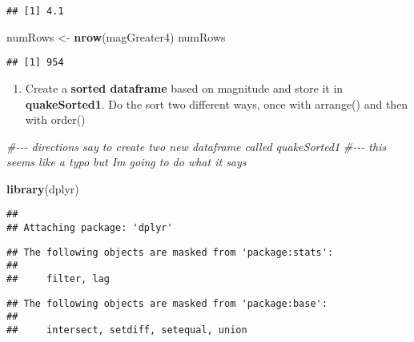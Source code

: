 \documentclass[
]{article}
\newenvironment{Shaded}{\begin{snugshade}}{\end{snugshade}}
\newcommand{\CommentTok}[1]{\textcolor[rgb]{0.56,0.35,0.01}{\textit{#1}}}
\newcommand{\FunctionTok}[1]{\textcolor[rgb]{0.13,0.29,0.53}{\textbf{#1}}}
\newcommand{\NormalTok}[1]{#1}
\newcommand{\OtherTok}[1]{\textcolor[rgb]{0.56,0.35,0.01}{#1}}
\newcommand{\SpecialCharTok}[1]{\textcolor[rgb]{0.81,0.36,0.00}{\textbf{#1}}}
\providecommand{\tightlist}{%
  \setlength{\itemsep}{0pt}\setlength{\parskip}{0pt}}
\begin{document}
\begin{verbatim}
## [1] 4.1
\end{verbatim}

\begin{Shaded}
\begin{Highlighting}[]
\NormalTok{numRows }\OtherTok{\textless{}{-}} \FunctionTok{nrow}\NormalTok{(magGreater4)}
\NormalTok{numRows}
\end{Highlighting}
\end{Shaded}

\begin{verbatim}
## [1] 954
\end{verbatim}

\begin{enumerate}
\def\labelenumi{\Alph{enumi}.}
\setcounter{enumi}{5}
\tightlist
\item
  Create a \textbf{sorted dataframe} based on magnitude and store it in
  \textbf{quakeSorted1}. Do the sort two different ways, once with
  arrange() and then with order()
\end{enumerate}

\begin{Shaded}
\begin{Highlighting}[]
\CommentTok{\#{-}{-}{-} directions say to create two new dataframe called quakeSorted1}
\CommentTok{\#{-}{-}{-} this seems like a typo but I\textquotesingle{}m going to do what it says}

\FunctionTok{library}\NormalTok{(dplyr)}
\end{Highlighting}
\end{Shaded}

\begin{verbatim}
## 
## Attaching package: 'dplyr'
\end{verbatim}

\begin{verbatim}
## The following objects are masked from 'package:stats':
## 
##     filter, lag
\end{verbatim}

\begin{verbatim}
## The following objects are masked from 'package:base':
## 
##     intersect, setdiff, setequal, union
\end{verbatim}

\begin{Shaded}
\end{Shaded}
\end{document}
